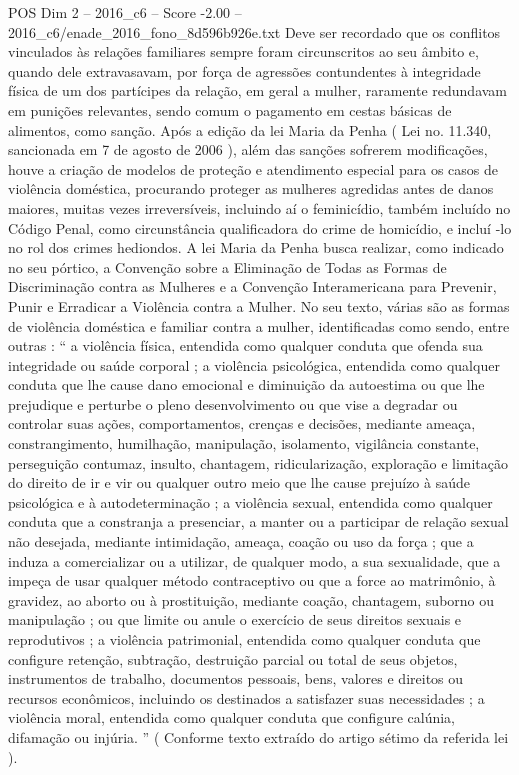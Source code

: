 \begin{textsample}{POS Dim 2 – 2016\_c6 – Score -2.00 – 2016\_c6/enade\_2016\_fono\_8d596b926e.txt}
Deve ser recordado que os conflitos vinculados às relações familiares sempre foram circunscritos ao seu âmbito e, quando dele extravasavam, por força de agressões contundentes à integridade física de um dos partícipes da relação, em geral a mulher, raramente redundavam em punições relevantes, sendo comum o pagamento em cestas básicas de alimentos, como sanção.
Após a edição da lei Maria da Penha ( Lei no. 11.340, sancionada em 7 de agosto de 2006 ), além das sanções sofrerem modificações, houve a criação de modelos de proteção e atendimento especial para os casos de violência doméstica, procurando proteger as mulheres agredidas antes de danos maiores, muitas vezes irreversíveis, incluindo aí o feminicídio, também incluído no Código Penal, como circunstância qualificadora do crime de homicídio, e incluí -lo no rol dos crimes hediondos.
A lei Maria da Penha busca realizar, como indicado no seu pórtico, a Convenção sobre a Eliminação de Todas as Formas de Discriminação contra as Mulheres e a Convenção Interamericana para Prevenir, Punir e Erradicar a Violência contra a Mulher.
No seu texto, várias são as formas de violência doméstica e familiar contra a mulher, identificadas como sendo, entre outras : “ a violência física, entendida como qualquer conduta que ofenda sua integridade ou saúde corporal ; a violência psicológica, entendida como qualquer conduta que lhe cause dano emocional e diminuição da autoestima ou que lhe prejudique e perturbe o pleno desenvolvimento ou que vise a degradar ou controlar suas ações, comportamentos, crenças e decisões, mediante ameaça, constrangimento, humilhação, manipulação, isolamento, vigilância constante, perseguição contumaz, insulto, chantagem, ridicularização, exploração e limitação do direito de ir e vir ou qualquer outro meio que lhe cause prejuízo à saúde psicológica e à autodeterminação ; a violência sexual, entendida como qualquer conduta que a constranja a presenciar, a manter ou a participar de relação sexual não desejada, mediante intimidação, ameaça, coação ou uso da força ; que a induza a comercializar ou a utilizar, de qualquer modo, a sua sexualidade, que a impeça de usar qualquer método contraceptivo ou que a force ao matrimônio, à gravidez, ao aborto ou à prostituição, mediante coação, chantagem, suborno ou manipulação ; ou que limite ou anule o exercício de seus direitos sexuais e reprodutivos ; a violência patrimonial, entendida como qualquer conduta que configure retenção, subtração, destruição parcial ou total de seus objetos, instrumentos de trabalho, documentos pessoais, bens, valores e direitos ou recursos econômicos, incluindo os destinados a satisfazer suas necessidades ; a violência moral, entendida como qualquer conduta que configure calúnia, difamação ou injúria. ” ( Conforme texto extraído do artigo sétimo da referida lei ).

\end{textsample}
